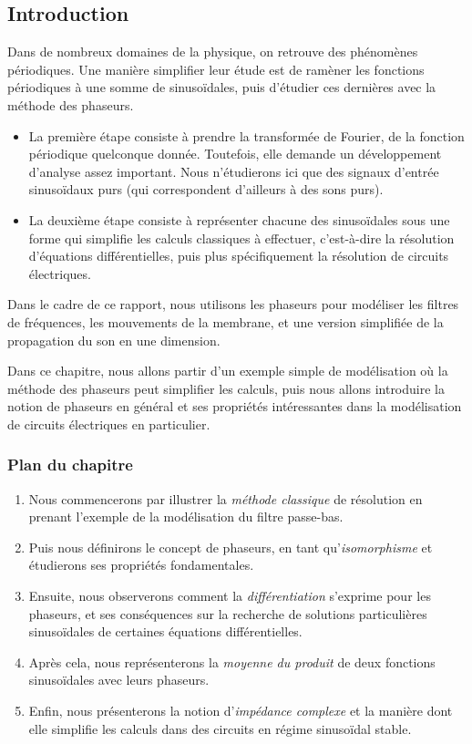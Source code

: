 \subsection*{Introduction}

Dans de nombreux domaines de la physique,
on retrouve des phénomènes périodiques.
Une manière simplifier leur étude
est de ramèner les fonctions périodiques à une somme de sinusoïdales,
puis d'étudier ces dernières avec la méthode des phaseurs.
\begin{itemize}
    \item La première étape consiste à prendre la transformée de Fourier,
        de la fonction périodique quelconque donnée.
        Toutefois, elle demande un développement d'analyse assez important.
        Nous n'étudierons ici que des signaux d'entrée sinusoïdaux purs
        (qui correspondent d'ailleurs à des sons purs).
    \item La deuxième étape consiste à représenter chacune des sinusoïdales
        sous une forme qui simplifie les calculs classiques à effectuer,
        c'est-à-dire la résolution d'équations différentielles,
        puis plus spécifiquement la résolution de circuits électriques.
\end{itemize}

Dans le cadre de ce rapport,
nous utilisons les phaseurs pour modéliser les filtres de fréquences,
les mouvements de la membrane,
et une version simplifiée de la propagation du son en une dimension.

Dans ce chapitre, nous allons partir d'un exemple simple de modélisation
où la méthode des phaseurs peut simplifier les calculs,
puis nous allons introduire la notion de phaseurs
en général et ses propriétés
intéressantes dans la modélisation de circuits électriques en particulier.

\subsubsection*{Plan du chapitre}
\begin{enumerate}
    \item Nous commencerons par illustrer la \emph{méthode classique}
        de résolution en prenant l'exemple de la modélisation
        du filtre passe-bas.
    \item Puis nous définirons le concept de phaseurs, 
        en tant qu'\emph{isomorphisme} et étudierons
        ses propriétés fondamentales.
    \item Ensuite, nous observerons comment la \emph{différentiation}
        s'exprime pour les phaseurs, et ses conséquences sur
        la recherche de solutions particulières sinusoïdales
        de certaines équations différentielles.
    \item Après cela, nous représenterons la \emph{moyenne du produit}
        de deux fonctions sinusoïdales avec leurs phaseurs.
    \item Enfin, nous présenterons la notion d'\emph{impédance complexe}
        et la manière dont elle simplifie les calculs
        dans des circuits en régime sinusoïdal stable.
\end{enumerate}
